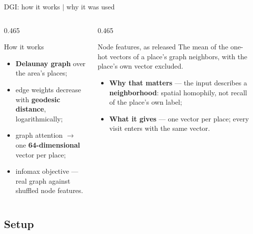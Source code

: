\documentclass{beamer}
\begin{document}
\begin{frame}{DGI: how it works $\mid$ why it was used}
    \begin{columns}[t,onlytextwidth]
        \begin{column}{0.465\textwidth}
            \begin{block}{How it works}
                \small
                \begin{itemize}\setlength{\itemsep}{3pt}\setlength{\parskip}{0pt}
                    \item \textbf{Delaunay graph} over the area's places;
                    \item edge weights decrease with \textbf{geodesic distance}, logarithmically;
                    \item graph attention $\rightarrow$ one \textbf{64-dimensional} vector per place;
                    \item infomax objective --- real graph against shuffled node features.
                \end{itemize}
            \end{block}
        \end{column}
        \hfill
        \begin{column}{0.465\textwidth}
            \begin{alertblock}{Node features, as released}
                \small
                The mean of the one-hot vectors of a place's graph neighbors,
                \alert{with the place's own vector excluded}.
            \end{alertblock}
            \small
            \begin{itemize}\setlength{\itemsep}{3pt}\setlength{\parskip}{0pt}
                \item \textbf{Why that matters} --- the input describes a \textbf{neighborhood}:
                      spatial homophily, not recall of the place's own label;
                \item \textbf{What it gives} --- one vector per place; every visit enters with
                      the same vector.
            \end{itemize}
        \end{column}
    \end{columns}
\end{frame}

\subsection{Setup}
\end{document}
